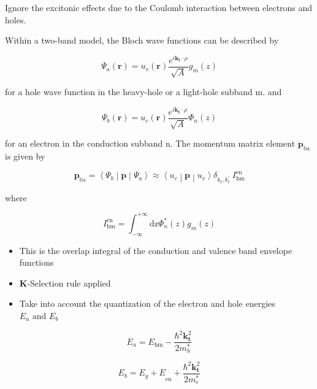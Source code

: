 Ignore the excitonic effects due to the Coulomb interaction between
electrons and holes.

Within a two-band model, the Bloch wave functions can be described by

\begin{equation}
\Psi_{a}\left( \bm{r} \right) = u_{v}(\bm{r})\frac{e^{i\bm{k}_{\bm{t}} \cdot \rho}}{\sqrt{A}}g_{m}(z)
\end{equation}

for a hole wave function in the heavy-hole or a light-hole subband m.
and

\begin{equation}
\Psi_{b}\left( \bm{r} \right) = u_{c}(\bm{r})\frac{e^{i\bm{k}_{\bm{t}} \cdot \rho}}{\sqrt{A}}\Phi_{n}(z)
\end{equation}

for an electron in the conduction subband n. The momentum matrix element
\(\bm{p}_{\text{ba}}\) is given by

\begin{equation}
\bm{p}_{\text{ba}}\bm{=}\left\langle \Psi_{b} \middle| \bm{p} \middle| \Psi_{a} \right\rangle \approx \left\langle u_{c} \middle| \bm{p} \middle| u_{v} \right\rangle\delta_{k_{t},k_{t}^{'}}\ I_{\text{hm}}^{\text{en}}
\end{equation}

where

\begin{equation}
I_{\text{hm}}^{\text{en}} = \int_{- \infty}^{+ \infty}{\text{dz}\Phi_{n}^{*}(z)}g_{m}(z)
\end{equation}

\begin{itemize}
\item
  This is the overlap integral of the conduction and valence band
  envelope functions
\item
  \textbf{K}-Selection rule applied
\item
  Take into account the quantization of the electron and hole energies
  \(E_{a}\text{\ and\ }E_{b}\)
\end{itemize}

\begin{equation}
E_{a} = E_{\text{hm}} - \frac{\hbar^{2}\bm{k}_{\bm{t}}^{2}}{2m_{h}^{*}}
\end{equation}

\begin{equation}
E_{b} = {E_{g} + E}_{\text{en}} + \frac{\hbar^{2}\bm{k}_{\bm{t}}^{2}}{2m_{e}^{*}}
\end{equation}

